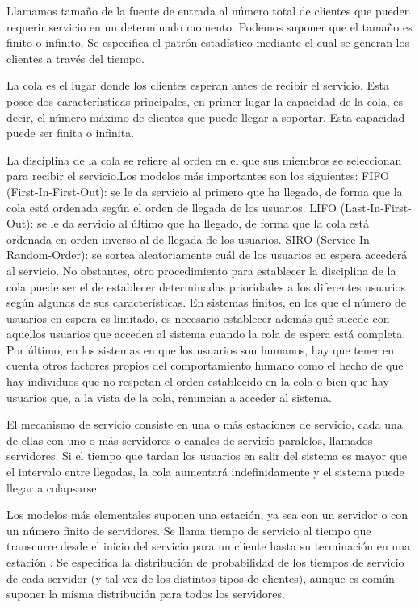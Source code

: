 \documentclass[12pt]{article}
\begin{document}
Llamamos tamaño de la fuente de entrada al número total de clientes que pueden
requerir servicio en un determinado momento. Podemos suponer que el tamaño es finito o
infinito. Se especifica el patrón estadístico mediante el cual se generan los clientes a
través del tiempo.

La cola es el lugar donde los clientes esperan antes de recibir el servicio. Esta posee dos
caracteríısticas principales, en primer lugar la capacidad de la cola, es decir, el número máximo
de clientes que puede llegar a soportar. Esta capacidad puede ser finita o infinita.

La disciplina de la cola se refiere al orden en el que sus miembros se seleccionan para
recibir el servicio.Los modelos más importantes son los siguientes:
FIFO (First-In-First-Out): se le da servicio al primero que ha llegado, de forma que la
cola está ordenada según el orden de llegada de los usuarios.
LIFO (Last-In-First-Out): se le da servicio al último que ha llegado, de forma que la
cola está ordenada en orden inverso al de llegada de los usuarios.
SIRO (Service-In-Random-Order): se sortea aleatoriamente cuál de los usuarios en
espera accederá al servicio.
No obstantes, otro procedimiento para establecer la disciplina de la cola puede ser el
de establecer determinadas prioridades a los diferentes usuarios según algunas de sus características.
En sistemas finitos, en los que el número de usuarios en espera es limitado, es necesario
establecer además qué sucede con aquellos usuarios que acceden al sistema cuando la cola
de espera está completa. Por último, en los sistemas en que los usuarios son humanos, hay
que tener en cuenta otros factores propios del comportamiento humano como el hecho de
que hay individuos que no respetan el orden establecido en la cola o bien que hay usuarios
que, a la vista de la cola, renuncian a acceder al sistema.


El mecanismo de servicio consiste en una o más estaciones de servicio, cada una de ellas
con uno o más servidores o canales de servicio paralelos, llamados servidores. Si el tiempo que tardan
los usuarios en salir del sistema es mayor que el intervalo entre llegadas, la cola aumentará
indefinidamente y el sistema puede llegar a colapsarse. 

Los modelos más elementales suponen una estación, ya sea con un servidor o con un
número finito de servidores. Se llama tiempo de servicio al
tiempo que transcurre desde el inicio del servicio para un cliente hasta su terminación en
una estación . Se especifica la distribución
de probabilidad de los tiempos de servicio de cada servidor (y tal vez de los distintos tipos
de clientes), aunque es común suponer la misma distribución para todos los servidores. 
\end{document}
